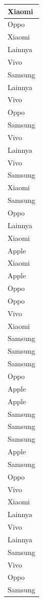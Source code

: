 \documentclass[
  letterpaper,
  DIV=11,
  numbers=noendperiod]{scrartcl}
\begin{document}
\begin{table}
\begin{tabular}[t]{l}
\hline
Xiaomi\\
\hline
Oppo\\
\hline
Xiaomi\\
\hline
Lainnya\\
\hline
Vivo\\
\hline
Samsung\\
\hline
Lainnya\\
\hline
Vivo\\
\hline
Oppo\\
\hline
Samsung\\
\hline
Vivo\\
\hline
Lainnya\\
\hline
Vivo\\
\hline
Samsung\\
\hline
Xiaomi\\
\hline
Samsung\\
\hline
Oppo\\
\hline
Lainnya\\
\hline
Xiaomi\\
\hline
Apple\\
\hline
Xiaomi\\
\hline
Apple\\
\hline
Oppo\\
\hline
Oppo\\
\hline
Vivo\\
\hline
Xiaomi\\
\hline
Samsung\\
\hline
Samsung\\
\hline
Samsung\\
\hline
Oppo\\
\hline
Apple\\
\hline
Apple\\
\hline
Samsung\\
\hline
Samsung\\
\hline
Samsung\\
\hline
Apple\\
\hline
Samsung\\
\hline
Oppo\\
\hline
Vivo\\
\hline
Xiaomi\\
\hline
Lainnya\\
\hline
Vivo\\
\hline
Lainnya\\
\hline
Samsung\\
\hline
Vivo\\
\hline
Oppo\\
\hline
Samsung\\

\end{tabular}
\end{table}
\end{document}
